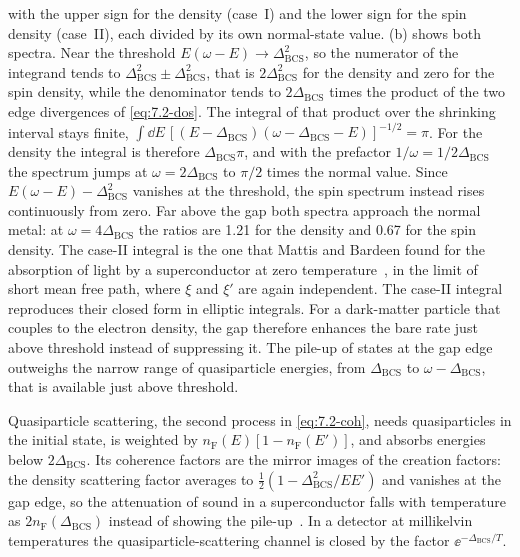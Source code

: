 with the upper sign for the density (case~I) and the lower sign for the spin density (case~II), each divided by its own normal-state value. (b) shows both spectra. Near the threshold $E(\omega - E) \to \Delta_{\mathrm{BCS}}^2$, so the numerator of the integrand tends to $\Delta_{\mathrm{BCS}}^2 \pm \Delta_{\mathrm{BCS}}^2$, that is $2\Delta_{\mathrm{BCS}}^2$ for the density and zero for the spin density, while the denominator tends to $2\Delta_{\mathrm{BCS}}$ times the product of the two edge divergences of \cref{eq:7.2-dos}. The integral of that product over the shrinking interval stays finite, $\int\dd E\,[(E - \Delta_{\mathrm{BCS}})(\omega - \Delta_{\mathrm{BCS}} - E)]^{-1/2} = \pi$. For the density the integral is therefore $\Delta_{\mathrm{BCS}}\pi$, and with the prefactor $1/\omega = 1/2\Delta_{\mathrm{BCS}}$ the spectrum jumps at $\omega = 2\Delta_{\mathrm{BCS}}$ to $\pi/2$ times the normal value. Since $E(\omega - E) - \Delta^2_{\mathrm{BCS}}$ vanishes at the threshold, the spin spectrum instead rises continuously from zero. Far above the gap both spectra approach the normal metal: at $\omega = 4\Delta_{\mathrm{BCS}}$ the ratios are 1.21 for the density and 0.67 for the spin density. The case-II integral is the one that Mattis and Bardeen found for the absorption of light by a superconductor at zero temperature~\cite{mattis1958theory}, in the limit of short mean free path, where $\xi$ and $\xi'$ are again independent. The case-II integral reproduces their closed form in elliptic integrals. For a dark-matter particle that couples to the electron density, the gap therefore enhances the bare rate just above threshold instead of suppressing it. The pile-up of states at the gap edge outweighs the narrow range of quasiparticle energies, from $\Delta_{\mathrm{BCS}}$ to $\omega - \Delta_{\mathrm{BCS}}$, that is available just above threshold.

Quasiparticle scattering, the second process in \cref{eq:7.2-coh}, needs quasiparticles in the initial state, is weighted by $n_{\mathrm{F}}(E)[1 - n_{\mathrm{F}}(E')]$, and absorbs energies below $2\Delta_{\mathrm{BCS}}$. Its coherence factors are the mirror images of the creation factors: the density scattering factor averages to $\frac12(1 - \Delta_{\mathrm{BCS}}^2/EE')$ and vanishes at the gap edge, so the attenuation of sound in a superconductor falls with temperature as $2n_{\mathrm{F}}(\Delta_{\mathrm{BCS}})$ instead of showing the pile-up~\cite{tinkham2004introduction}. In a detector at millikelvin temperatures the quasiparticle-scattering channel is closed by the factor $\ee^{-\Delta_{\mathrm{BCS}}/T}$.

